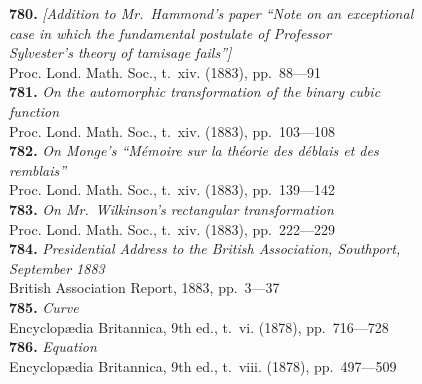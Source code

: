 \documentclass[12pt,a4paper,oneside]{book}
\begin{document}
\small
\noindent\textbf{780.} \textit{[Addition to Mr.~Hammond's paper ``Note on an exceptional}\\
\hspace*{2em}\textit{case in which the fundamental postulate of Professor}\\
\hspace*{2em}\textit{Sylvester's theory of tamisage fails'']} \\
\hspace*{2em}Proc. Lond. Math. Soc., t.~xiv. (1883), pp.~88---91\\[0.4em]
\textbf{781.} \textit{On the automorphic transformation of the binary cubic}\\
\hspace*{2em}\textit{function} \\
\hspace*{2em}Proc. Lond. Math. Soc., t.~xiv. (1883), pp.~103---108\\[0.4em]
\textbf{782.} \textit{On Monge's ``M\'emoire sur la th\'eorie des d\'eblais et des}\\
\hspace*{2em}\textit{remblais''} \\
\hspace*{2em}Proc. Lond. Math. Soc., t.~xiv. (1883), pp.~139---142\\[0.4em]
\textbf{783.} \textit{On Mr.~Wilkinson's rectangular transformation} \\
\hspace*{2em}Proc. Lond. Math. Soc., t.~xiv. (1883), pp.~222---229\\[0.4em]
\textbf{784.} \textit{Presidential Address to the British Association, Southport,}\\
\hspace*{2em}\textit{September 1883} \\
\hspace*{2em}British Association Report, 1883, pp.~3---37\\[0.4em]
\textbf{785.} \textit{Curve} \\
\hspace*{2em}Encyclop\ae{}dia Britannica, 9th ed., t.~vi. (1878), pp.~716---728\\[0.4em]
\textbf{786.} \textit{Equation} \\
\hspace*{2em}Encyclop\ae{}dia Britannica, 9th ed., t.~viii. (1878), pp.~497---509\\[0.4em]
\end{document}
